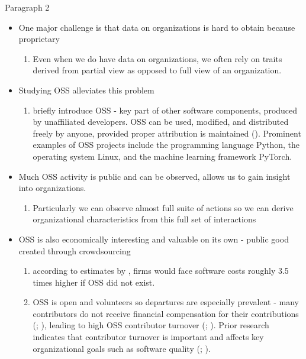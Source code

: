 \documentclass[12pt,notitlepage]{article}
\begin{document}
Paragraph 2
\begin{itemize}
    \item One major challenge is that data on organizations is hard to obtain because proprietary 
    \begin{enumerate}
        \item Even when we do have data on organizations, we often rely on traits derived from partial view as opposed to full view of an organization.
    \end{enumerate}
    \item Studying OSS alleviates this problem
    \begin{enumerate}
        \item briefly introduce OSS - key part of other software components, produced by unaffiliated developers. OSS can be used, modified, and distributed freely by anyone, provided proper attribution is maintained (\cite{linux_foundation_what_2017}). Prominent examples of OSS projects include the programming language Python, the operating system Linux, and the machine learning framework PyTorch. 
    \end{enumerate}
    \item Much OSS activity is public and can be observed, allows us to gain insight into organizations. 
    \begin{enumerate}
        \item Particularly we can observe almost full suite of actions so we can derive organizational characteristics from this full set of interactions
    \end{enumerate}
    \item OSS is also economically interesting and valuable on its own - public good created through crowdsourcing
    \begin{enumerate}
        \item according to estimates by \cite{hoffmann_value_2024}, firms would face software costs roughly 3.5 times higher if OSS did not exist. 
        \item     OSS is open and volunteers so departures are especially prevalent - many contributors do not receive financial compensation for their contributions (\cite{robles_evolution_2005}; \cite{xu_volunteers_2010}), leading to high OSS contributor turnover (\cite{izquierdo-cortazar_using_2009}; \cite{rashid_systematic_2019}). Prior research indicates that contributor turnover is important and affects key organizational goals such as  software quality (\cite{mockus_organizational_2010}; \cite{foucault_impact_2015}). 
    \end{enumerate}
\end{itemize}
\end{document}
